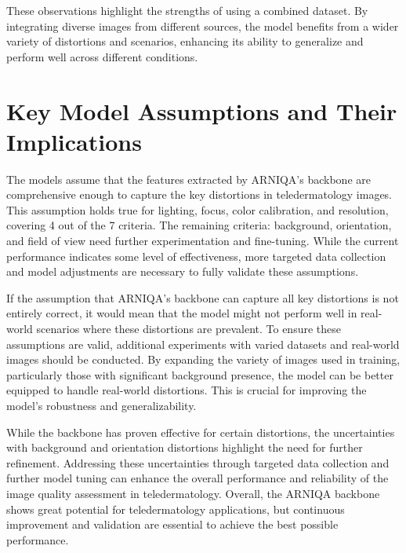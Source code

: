 \noindent
These observations highlight the strengths of using a combined dataset. By integrating diverse images from different sources, the model benefits from a wider variety of distortions and scenarios, enhancing its ability to generalize and perform well across different conditions. \par
\section{Key Model Assumptions and Their Implications}
\label{sec:KeyModelAssumptions}
The models assume that the features extracted by ARNIQA’s backbone are comprehensive enough to capture the key distortions in teledermatology images. This assumption holds true for lighting, focus, color calibration, and resolution, covering 4 out of the 7 criteria. The remaining criteria: background, orientation, and field of view need further experimentation and fine-tuning. While the current performance indicates some level of effectiveness, more targeted data collection and model adjustments are necessary to fully validate these assumptions.\par
\vspace{\baselineskip}
\noindent
If the assumption that ARNIQA’s backbone can capture all key distortions is not entirely correct, it would mean that the model might not perform well in real-world scenarios where these distortions are prevalent. To ensure these assumptions are valid, additional experiments with varied datasets and real-world images should be conducted. By expanding the variety of images used in training, particularly those with significant background presence, the model can be better equipped to handle real-world distortions. This is crucial for improving the model’s robustness and generalizability.\par
\vspace{\baselineskip}
\noindent
While the backbone has proven effective for certain distortions, the uncertainties with background and orientation distortions highlight the need for further refinement. Addressing these uncertainties through targeted data collection and further model tuning can enhance the overall performance and reliability of the image quality assessment in teledermatology. Overall, the ARNIQA backbone shows great potential for teledermatology applications, but continuous improvement and validation are essential to achieve the best possible performance.\par

